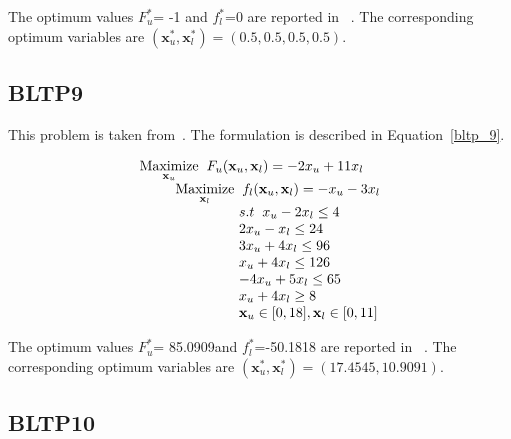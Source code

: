 The optimum values $F_u^*$= -1 and  $f_l^*$=0 are reported in ~\cite{Angelobilevel}. The corresponding optimum variables are $(\mathbf{x}^*_u, \mathbf{x}^*_l)=(0.5,0.5,0.5,0.5).$

\subsection{BLTP9}

This problem is taken from~\cite{rajesh2003tabu}. The formulation is described in Equation~\ref{bltp_9}. 

\begin{equation}
\begin{array}{lr}
\underset{\mathbf{x}_u}{\text{Maximize}}\hspace{2mm} F_u(\mathbf{x}_u, \mathbf{ x}_l)=-2x_u+11x_l\\


\hspace{9mm} \underset{\mathbf{x}_l} {\text{Maximize}}\hspace{2mm} f_l(\mathbf{x}_u, \mathbf{ x}_l)=-x_u-3x_l \\
\hspace{25mm}s.t\hspace{2mm} x_u-2x_l\leq 4\\
\hspace{25mm} 2x_u-x_l\leq 24\\
\hspace{25mm} 3x_u+4x_l\leq 96\\
\hspace{25mm} x_u+4x_l\leq 126\\
\hspace{25mm} -4x_u+5x_l\leq 65\\
\hspace{25mm} x_u+4x_l\geq 8\\
\hspace{25mm} \mathbf{x}_u \in {[0,18]},\mathbf{x}_l \in [0,11] \\
\end{array}
\label{bltp_9}
\end{equation}

The optimum values $F_u^*$= 85.0909and  $f_l^*$=-50.1818 are reported in ~\cite{Angelobilevel}. The corresponding optimum variables are $(\mathbf{x}^*_u, \mathbf{x}^*_l)=(17.4545,10.9091)$.


\subsection{BLTP10}

